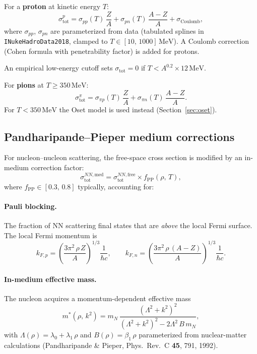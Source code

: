 \documentclass[11pt,a4paper]{article}
\newcommand{\unit}[1]{\,\mathrm{#1}}
\newcommand{\MeV}{\unit{MeV}}
\begin{document}
For a \textbf{proton} at kinetic energy $T$:
\begin{equation}
  \sigma_{\text{tot}}^{p}
  = \sigma_{pp}(T)\,\frac{Z}{A}
  + \sigma_{pn}(T)\,\frac{A-Z}{A}
  + \sigma_{\text{Coulomb}},
\end{equation}
where $\sigma_{pp}$, $\sigma_{pn}$ are parameterized from data
(tabulated splines in \texttt{INukeHadroData2018}, clamped to
$T \in [10,\,1000]\MeV$).  A Coulomb correction (Cohen formula with
penetrability factor) is added for protons.

An empirical low-energy cutoff sets $\sigma_{\text{tot}} = 0$ if
$T < A^{0.2} \times 12\MeV$.

For \textbf{pions} at $T \ge 350\MeV$:
\begin{equation}
  \sigma_{\text{tot}}^{\pi}
  = \sigma_{\pi p}(T)\,\frac{Z}{A}
  + \sigma_{\pi n}(T)\,\frac{A-Z}{A}.
\end{equation}
For $T < 350\MeV$ the Oset model is used instead
(Section~\ref{sec:oset}).

\subsection{Pandharipande--Pieper medium corrections}
\label{sec:pp}

For nucleon--nucleon scattering, the free-space cross section is modified
by an in-medium correction factor:
\begin{equation}
  \sigma_{\text{tot}}^{NN,\text{med}}
  = \sigma_{\text{tot}}^{NN,\text{free}}
    \times f_{\text{PP}}(\rho,\,T),
\end{equation}
where $f_{\text{PP}} \in [0.3,\,0.8]$ typically, accounting for:

\paragraph{Pauli blocking.}
The fraction of NN scattering final states that are \emph{above} the local
Fermi surface.  The local Fermi momentum is
\begin{equation}
  k_{F,p} = \left(\frac{3\pi^{2}\,\rho\,Z}{A}\right)^{\!1/3}\!\!\frac{1}{\hbar c},
  \qquad
  k_{F,n} = \left(\frac{3\pi^{2}\,\rho\,(A-Z)}{A}\right)^{\!1/3}\!\!\frac{1}{\hbar c}.
\end{equation}

\paragraph{In-medium effective mass.}
The nucleon acquires a momentum-dependent effective mass
\begin{equation}
  m^{*}(\rho,\,k^{2})
  = m_{N}\,\frac{(\Lambda^{2} + k^{2})^{2}}
               {(\Lambda^{2} + k^{2})^{2} - 2\Lambda^{2}\,B\,m_{N}},
\end{equation}
with $\Lambda(\rho) = \lambda_{0} + \lambda_{1}\,\rho$ and
$B(\rho) = \beta_{1}\,\rho$ parameterized from nuclear-matter
calculations (Pandharipande \& Pieper, Phys.\ Rev.\ C \textbf{45}, 791, 1992).
\end{document}
